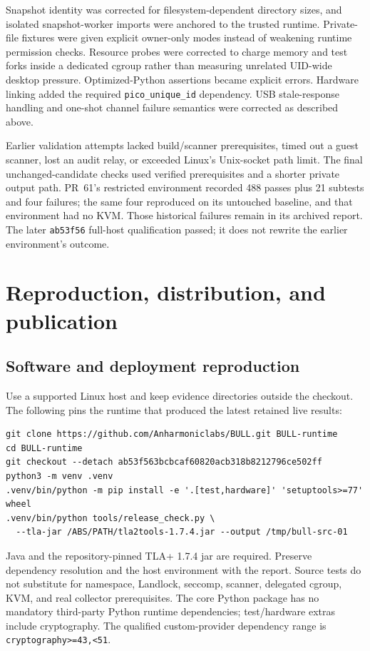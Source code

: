 \documentclass[journal]{IEEEtran}
\newcommand{\code}[1]{\texttt{#1}}
\begin{document}
Snapshot identity was corrected for filesystem-dependent directory sizes, and isolated snapshot-worker imports were anchored to the trusted runtime. Private-file fixtures were given explicit owner-only modes instead of weakening runtime permission checks. Resource probes were corrected to charge memory and test forks inside a dedicated cgroup rather than measuring unrelated UID-wide desktop pressure. Optimized-Python assertions became explicit errors. Hardware linking added the required \code{pico\_unique\_id} dependency. USB stale-response handling and one-shot channel failure semantics were corrected as described above.

Earlier validation attempts lacked build/scanner prerequisites, timed out a guest scanner, lost an audit relay, or exceeded Linux's Unix-socket path limit. The final unchanged-candidate checks used verified prerequisites and a shorter private output path. PR~61's restricted environment recorded 488 passes plus 21 subtests and four failures; the same four reproduced on its untouched baseline, and that environment had no KVM. Those historical failures remain in its archived report. The later \code{ab53f56} full-host qualification passed; it does not rewrite the earlier environment's outcome.

\section{Reproduction, distribution, and publication}
\subsection{Software and deployment reproduction}
Use a supported Linux host and keep evidence directories outside the checkout. The following pins the runtime that produced the latest retained live results:
\begin{lstlisting}
git clone https://github.com/Anharmoniclabs/BULL.git BULL-runtime
cd BULL-runtime
git checkout --detach ab53f563bcbcaf60820acb318b8212796ce502ff
python3 -m venv .venv
.venv/bin/python -m pip install -e '.[test,hardware]' 'setuptools>=77' wheel
.venv/bin/python tools/release_check.py \
  --tla-jar /ABS/PATH/tla2tools-1.7.4.jar --output /tmp/bull-src-01
\end{lstlisting}
Java and the repository-pinned TLA+ 1.7.4 jar are required. Preserve dependency resolution and the host environment with the report. Source tests do not substitute for namespace, Landlock, seccomp, scanner, delegated cgroup, KVM, and real collector prerequisites. The core Python package has no mandatory third-party Python runtime dependencies; test/hardware extras include cryptography. The qualified custom-provider dependency range is \code{cryptography>=43,<51}.
\end{document}
